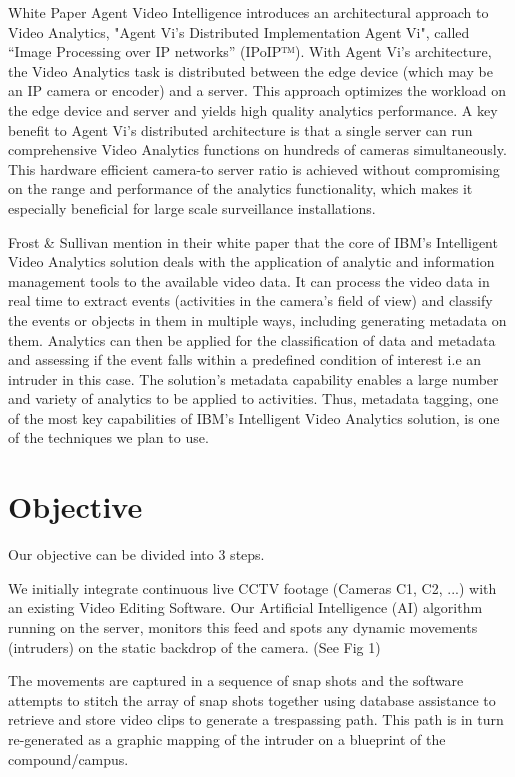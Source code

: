 \documentclass[12pt]{article}
\begin{document}
\noindent
White Paper Agent Video Intelligence \cite{num:2} introduces an architectural approach to Video Analytics, "Agent Vi’s Distributed Implementation Agent Vi", called “Image Processing over IP networks” (IPoIP™). With Agent Vi’s architecture, the Video Analytics task is distributed between the edge device (which may be an IP camera or encoder) and a server. This approach optimizes the workload on the edge device and server and yields high quality analytics performance. A key benefit to Agent Vi’s distributed architecture is that a single server can run comprehensive Video Analytics functions on hundreds of cameras simultaneously. This hardware efficient camera-to server ratio is achieved without compromising on the range and performance of the analytics functionality, which makes it especially beneficial for large scale surveillance installations.
\newline

\noindent
Frost \& Sullivan mention in their white paper \cite{num:3} that the core of IBM's Intelligent Video Analytics solution deals with the application of analytic and information management tools to the available video data.
It can process the video data in real time to extract events (activities in the camera’s field of view) and classify the events or objects in them in multiple ways, including generating metadata on them.
Analytics can then be applied for the classification of data and metadata and assessing if the event falls within a predefined condition of interest i.e an intruder in this case.
The solution’s metadata capability enables a large number and variety of analytics to be applied to activities. Thus, metadata tagging, one of the most key capabilities of IBM's Intelligent Video Analytics solution, is one of the techniques we plan to use.

\section{Objective}

Our objective can be divided into 3 steps.

We initially integrate continuous live CCTV footage (Cameras C1, C2, ...) with an existing Video Editing Software. Our Artificial Intelligence (AI) algorithm running on the server, monitors this feed and spots any dynamic movements (intruders) on the static backdrop of the camera. (See Fig 1)

The movements are captured in a sequence of snap shots and the software attempts to stitch the array of snap shots together using database assistance to retrieve and store video clips to generate a trespassing path. This path is in turn re-generated as a graphic mapping of the intruder on a blueprint of the compound/campus.
\end{document}
